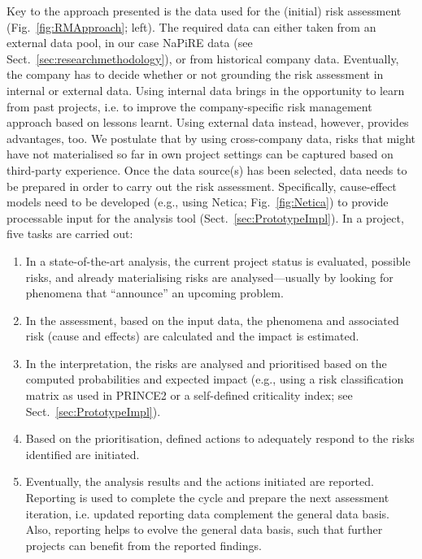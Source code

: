 \documentclass[lnbip]{svmultln}
\begin{document}
Key to the approach presented is the data used for the (initial) risk assessment (Fig.~\ref{fig:RMApproach}; left). The required data can either taken from an external data pool, in our case NaPiRE data (see Sect.~\ref{sec:researchmethodology}), or from historical company data. Eventually, the company has to decide whether or not grounding the risk assessment in internal or external data. Using internal data brings in the opportunity to learn from past projects, i.e. to improve the company-specific risk management approach based on lessons learnt. Using external data instead, however, provides advantages, too. We postulate that by using cross-company data, risks that might have not materialised so far in own project settings can be captured based on third-party experience. Once the data source(s) has been selected, data needs to be prepared in order to carry out the risk assessment. Specifically, cause-effect models need to be developed (e.g., using Netica; Fig.~\ref{fig:Netica}) to provide processable input for the analysis tool (Sect.~\ref{sec:PrototypeImpl}). In a project, five tasks are carried out: 
\begin{enumerate}
	\item In a state-of-the-art analysis, the current project status is evaluated, possible risks, and already materialising risks are analysed---usually by looking for phenomena that ``announce'' an upcoming problem.
	\item In the assessment, based on the input data, the phenomena and associated risk (cause and effects) are calculated and the impact is estimated.
	\item In the interpretation, the risks are analysed and prioritised based on the computed probabilities and expected impact (e.g., using a risk classification matrix as used in PRINCE2 or a self-defined criticality index; see Sect.~\ref{sec:PrototypeImpl}).
	\item Based on the prioritisation, defined actions to adequately respond to the risks identified are initiated.
	\item Eventually, the analysis results and the actions initiated are reported. Reporting is used to complete the cycle and prepare the next assessment iteration, i.e. updated reporting data complement the general data basis. Also, reporting helps to evolve the general data basis, such that further projects can benefit from the reported findings.
\end{enumerate}
\end{document}
